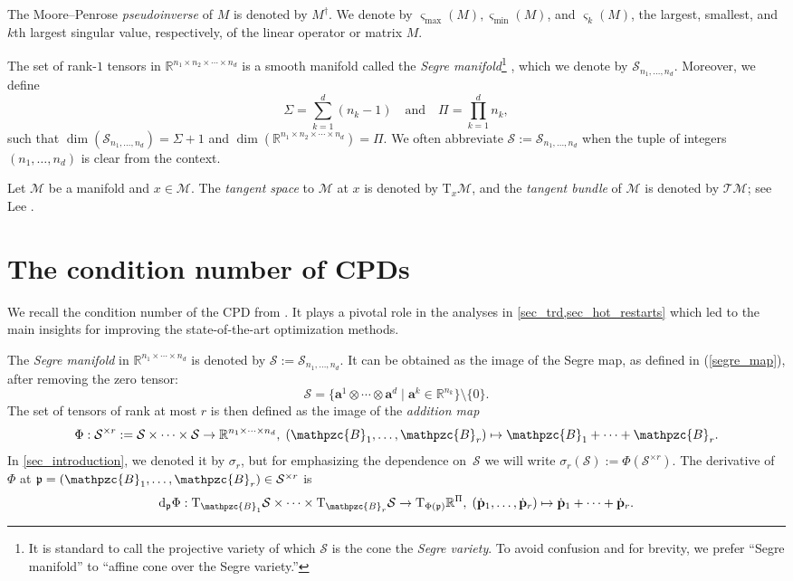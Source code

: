 \documentclass[a4paper,10pt,final]{siamart1116}
\newcommand{\tuple}[1]{\mathfrak{#1}}
\newcommand{\Var}[1]{\mathcal{#1}}
\newcommand{\tensor}[1]{\mathpzc{#1}}
\newcommand{\vect}[1]{\mathbf{#1}}
\newcommand{\sten}[3]{\vect{#1}_{#2}^{#3}}
\newcommand{\Tang}[2]{\mathrm{T}_{#1} {#2}}
\newcommand{\deriv}[2]{\mathrm{d}_{#1}#2}
\newcommand{\R}{\mathbb{R}}
\newcommand{\refeqn}[1]{{(\ref{#1})}}
\numberwithin{equation}{section}
\numberwithin{figure}{section}
\numberwithin{table}{section}
\numberwithin{theorem}{section}
\begin{document}
The Moore--Penrose \emph{pseudoinverse} of $M$ \cite[chapter 3, section 1]{MPT} is denoted by $M^\dagger$. We denote by $\varsigma_{\max}(M), \varsigma_{\min}(M)$, and $\varsigma_k(M)$, the largest, smallest, and $k$th largest singular value, respectively, of the linear operator or matrix $M$.

The set of rank-$1$ tensors in $\R^{n_1 \times n_2 \times \cdots \times n_d}$ is a smooth manifold called the \emph{Segre manifold}\footnote{It is standard to call the projective variety of which $\Var{S}$ is the cone the \emph{Segre variety}. To avoid confusion and for brevity, we prefer ``Segre manifold'' to ``affine cone over the Segre variety.''} \cite[section 4.3.5]{Landsberg2012}, which we denote by $\Var{S}_{n_1,\ldots,n_d}$. Moreover, we define
\begin{equation*} %
\Sigma = \sum_{k=1}^d (n_k - 1)\quad\text{and}\quad \Pi = \prod_{k=1}^d n_k,
\end{equation*}
such that $\dim(\Var{S}_{n_1,\ldots,n_d})=\Sigma+1$ and $\dim (\R^{n_1 \times n_2 \times \cdots \times n_d}) = \Pi$. We often abbreviate $\Var{S}:=\Var{S}_{n_1,\ldots,n_d}$ when the tuple of integers $(n_1,\ldots,n_d)$ is clear from the context.

Let $\Var{M}$ be a manifold and $x \in \Var{M}$. The \emph{tangent space} to $\Var{M}$ at $x$ is denoted by $\Tang{x}{\Var{M}}$, and the \emph{tangent bundle} of $\Var{M}$ is denoted by $\Var{T}\Var{M}$; see Lee \cite{Lee2013}.

\section{The condition number of CPDs} \label{sec_condition_number}
We recall the condition number of the CPD from \cite{BV2017}. It plays a pivotal role in the analyses in \cref{sec_trd,sec_hot_restarts} which led to the main insights for improving the state-of-the-art optimization methods.

The \emph{Segre manifold} in $\R^{n_1  \times \cdots \times n_d}$ is denoted by $\Var{S}:=\Var{S}_{n_1,\ldots,n_d}$. It can be obtained as the image of the Segre map, as defined in \refeqn{segre_map}, after removing the zero tensor:
$$
\Var{S} = \{ \sten{a}{ }{1} \otimes \cdots \otimes \sten{a}{ }{d} \mid \sten{a}{ }{k}\in\R^{n_k} \} \setminus \{0\}.
$$
The set of tensors of rank at most $r$ is then defined as the image of the \emph{addition map}
\begin{equation}\label{Phi}
\Phi: \Var{S}^{\times r}:= \Var{S}\times \cdots \times \Var{S} \to \R^{n_1\times \cdots \times n_d},\;
(\tensor{B}_1, \ldots, \tensor{B}_r) \mapsto \tensor{B}_1 + \cdots + \tensor{B}_r.
\end{equation}
In \cref{sec_introduction}, we denoted it by $\sigma_r$, but for emphasizing the dependence on~$\Var{S}$ we will write
$
\sigma_r(\Var{S}):=\Phi(\Var{S}^{\times r}).
$
The derivative of $\Phi$ at $\tuple{p}=(\tensor{B}_1,\ldots,\tensor{B}_r)\in \Var{S}^{\times r}$ is
\[
\deriv{\tuple{p}}{\Phi} : \Tang{\tensor{B}_1}{\Var{S}} \times \cdots \times \Tang{\tensor{B}_r}{\Var{S}} \to \Tang{\Phi(\tuple{p})}{\R^\Pi}, \; (\dot{\vect{p}}_1, \ldots, \dot{\vect{p}}_r ) \mapsto \dot{\vect{p}}_1 + \cdots + \dot{\vect{p}}_r.
\]
\end{document}
